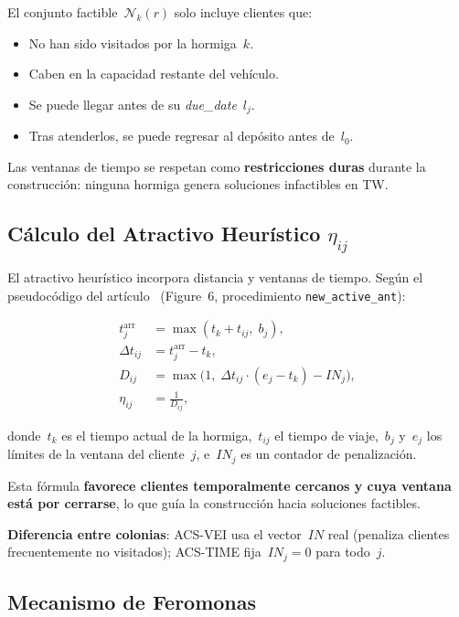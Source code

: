 \documentclass[12pt, letterpaper]{article}
\begin{document}
El conjunto factible~$\mathcal{N}_k(r)$ solo incluye clientes que:
\begin{itemize}[leftmargin=2cm]
  \item No han sido visitados por la hormiga~$k$.
  \item Caben en la capacidad restante del vehículo.
  \item Se puede llegar antes de su \textit{due\_date}~$l_j$.
  \item Tras atenderlos, se puede regresar al depósito antes de~$l_0$.
\end{itemize}

Las ventanas de tiempo se respetan como \textbf{restricciones duras} durante la construcción: ninguna hormiga genera soluciones infactibles en TW.

\subsection{Cálculo del Atractivo Heurístico \texorpdfstring{$\eta_{ij}$}{η\_ij}}

El atractivo heurístico incorpora distancia y ventanas de tiempo. Según el pseudocódigo del artículo~\cite{gambardella1999} (Figure~6, procedimiento \texttt{new\_active\_ant}):

\begin{align}
  t_j^{\text{arr}} &= \max(t_k + t_{ij},\; b_j), \label{eq:arrival} \\
  \Delta t_{ij} &= t_j^{\text{arr}} - t_k, \label{eq:delta} \\
  D_{ij} &= \max\bigl(1,\; \Delta t_{ij} \cdot (e_j - t_k) - IN_j\bigr), \label{eq:distance_composite} \\
  \eta_{ij} &= \frac{1}{D_{ij}}, \label{eq:eta}
\end{align}

\noindent donde~$t_k$ es el tiempo actual de la hormiga,~$t_{ij}$ el tiempo de viaje,~$b_j$ y~$e_j$ los límites de la ventana del cliente~$j$, e~$IN_j$ es un contador de penalización.

Esta fórmula \textbf{favorece clientes temporalmente cercanos y cuya ventana está por cerrarse}, lo que guía la construcción hacia soluciones factibles.

\textbf{Diferencia entre colonias}: ACS-VEI usa el vector~$IN$ real (penaliza clientes frecuentemente no visitados); ACS-TIME fija~$IN_j = 0$ para todo~$j$.

\subsection{Mecanismo de Feromonas}
\end{document}
